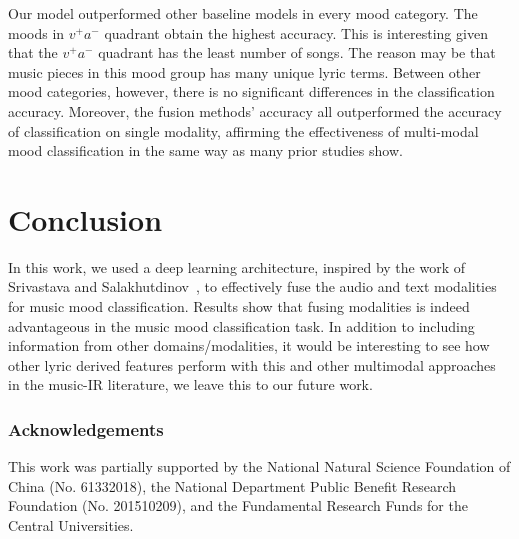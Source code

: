 \documentclass{llncs}
\begin{document}
Our model outperformed other baseline models in every mood category. The moods in $v^{+}a^{-}$ quadrant obtain the highest accuracy. This is interesting given that the $v^{+}a^{-}$ quadrant has the least number of songs. The reason may be that music pieces in this mood group has many unique lyric terms. Between other mood categories, however, there is no significant differences in the classification accuracy. Moreover, the fusion methods' accuracy all outperformed the accuracy of classification on single modality, affirming the effectiveness of multi-modal mood classification in the same way as many prior studies show.


\section{Conclusion}%
In this work, we used a deep learning architecture, inspired by the work of Srivastava and Salakhutdinov~\cite{DBLP:journals/jmlr/SrivastavaS14}, to effectively fuse the audio and text modalities for music mood classification. 
Results show that fusing modalities is indeed advantageous in the music mood classification task. In addition to including information from other domains/modalities, it would be interesting to see how other lyric derived features perform with this and other multimodal approaches in the music-IR literature, we leave this to our future work.

\subsubsection*{Acknowledgements}
This work was partially supported by the National Natural Science Foundation of China (No. 61332018), the National Department Public Benefit Research Foundation (No. 201510209), and the Fundamental Research Funds for the Central Universities.


%

	
\end{document}
